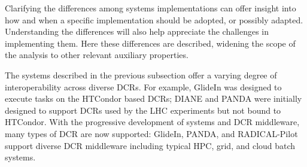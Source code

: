 \documentclass{sig-alternate}
\begin{document}

Clarifying the differences among \pilot systems implementations can offer
insight into how and when a specific implementation should be adopted, or
possibly adapted. Understanding the differences will also help appreciate the
challenges in implementing them.  Here these differences are described, widening
the scope of the analysis to other relevant auxiliary properties.









The \pilot systems described in the previous subsection offer a varying degree
of interoperability across diverse DCRs.  For example, GlideIn was designed to
execute tasks on the HTCondor based DCRs; DIANE and PANDA were initially
designed to support DCRs used by the LHC experiments but not bound to HTCondor.
With the progressive development of \pilot systems and DCR middleware, many
types of DCR are now supported: GlideIn, PANDA, and RADICAL-Pilot support
diverse DCR middleware including typical HPC, grid, and cloud batch systems.

\end{document}

